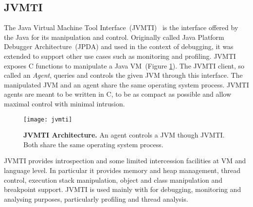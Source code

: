 %


\subsection*{JVMTI}
The Java Virtual Machine Tool Interface~(JVMTI)~\cite{JVMPI} is the interface offered by the Java \VM for its manipulation and control. Originally called Java Platform Debugger Architecture~(JPDA) and used in the context of debugging, it was extended to support other use cases such as monitoring and profiling.
JVMTI exposes C functions to manipulate a Java VM~(Figure \ref{fig:jvmti}). The JVMTI client, so called an \emph{Agent}, queries and controls the given JVM through this interface. The manipulated JVM and an agent share the same operating system process. JVMTI agents are meant to be written in C, to be as compact as possible and allow maximal control with minimal intrusion.

\begin{figure}[ht]
\begin{center}
\texttt{[image: jvmti]}
\caption{\textbf{JVMTI Architecture.} An agent controls a JVM though JVMTI. Both share the same operating system process.\label{fig:jvmti}}
\end{center}
\end{figure}

JVMTI provides introspection and some limited intercession facilities at VM and language level. In particular it provides memory and heap management, thread control, execution stack manipulation, object and class manipulation and breakpoint support. JVMTI is used mainly with for debugging, monitoring and analysing purposes, particularly profiling and thread analysis.

